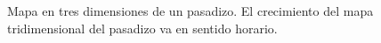 \begin{figure}[ht!]
\begin{center}
    \end{center}
  \captionsetup{font=footnotesize}
    \caption{\label{fig:pasadizo3D}Mapa en tres dimensiones de un pasadizo. El crecimiento del mapa 
    tridimensional del pasadizo va en sentido horario.}
\end{figure}


